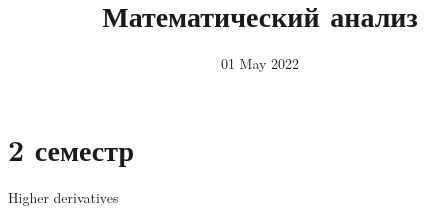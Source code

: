 
\title{Математический анализ}
\author{}
\date{01 May 2022}

\maketitle
\section{2 семестр}
\begin{description}
    \item[Higher derivatives] 
\end{description}
